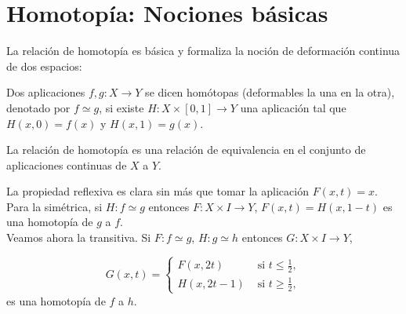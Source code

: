 \fancyhead[LO,RE]{\itshape \rightmark}
\chapter{Homotopía: Nociones básicas}\label{sec:homotbas}
La relación de homotopía es básica y formaliza la noción de deformación continua de dos espacios: 
\begin{defin}
Dos aplicaciones $f, g : X \longrightarrow Y$ se dicen homótopas (deformables la una en la otra), denotado por $f \simeq g$, si existe  $H : X \times [0,1] \longrightarrow Y$ una aplicación tal que $H(x ,0) = f(x)$ y $H(x, 1) = g(x)$.
\end{defin}
\begin{prop}
La relación de homotopía es una relación de equivalencia en el conjunto de aplicaciones continuas de $X$ a $Y$.
\end{prop}
\begin{demo} 
La propiedad reflexiva es clara sin más que tomar la aplicación $F(x,t) = x$.\\
Para la simétrica, si $H : f \simeq g$ entonces $F : X \times I \longrightarrow Y$, $F(x, t) = H(x, 1-t)$ es una homotopía de $g$ a $f$.\\
Veamos ahora la transitiva. Si $F : f \simeq g$, $H : g \simeq h$ entonces $G : X \times I \longrightarrow Y$,

$$G(x, t) = 
\begin{cases}
	F(x, 2t) 	& 	\text{ si } t \leq \frac{1}{2},\\
	H(x, 2t - 1)& 	\text{ si } t \geq \frac{1}{2},
\end{cases}$$ 
es una homotopía de $f$ a $h$.
\end{demo}
\begin{ejems}
\end{ejems}
